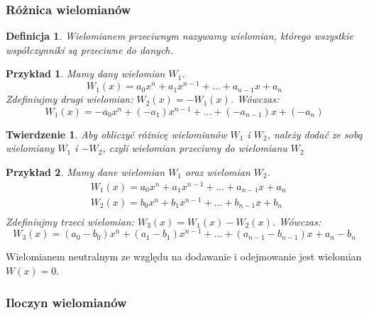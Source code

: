 \documentclass[twoside,a4paper]{book}
\newtheorem{theorem}{Twierdzenie}
\newtheorem{definition}{Definicja}
\newtheorem{example}{Przykład}
\begin{document}
\subsubsection{Różnica wielomianów}

\begin{definition}
	Wielomianem przeciwnym nazywamy wielomian, którego wszystkie współczynniki są przeciwne do danych.
\end{definition}

\begin{example}
	Mamy dany wielomian $W_1$.
	\begin{equation}
		W_1(x) = a_0x^n + a_1x^{n-1} + ... + a_{n-1}x + a_n
	\end{equation}
	Zdefiniujmy drugi wielomian: $W_2(x) = -W_1(x)$. Wówczas:
	\begin{equation}
		W_1(x) = -a_0x^n + (-a_1)x^{n-1} + ... + (-a_{n-1})x + (-a_n)
	\end{equation}
\end{example}

\begin{theorem}
	Aby obliczyć różnicę wielomianów $W_1$ i $W_2$, należy dodać ze sobą wielomiany $W_1$ i $-W_2$, czyli wielomian przeciwny do wielomianu $W_2$
\end{theorem}

\begin{example}
	Mamy dane wielomian $W_1$ oraz wielomian $W_2$.
	\begin{equation}
		\begin{split}
			&W_1(x) = a_0x^n + a_1x^{n-1} + ... + a_{n-1}x + a_n \\
			&W_2(x) = b_0x^n + b_1x^{n-1} + ... + b_{n-1}x + b_n \\
		\end{split}
	\end{equation}
	Zdefiniujmy trzeci wielomian: $W_3(x) = W_1(x) - W_2(x)$. Wówczas:
	\begin{equation}
		W_3(x) = (a_0-b_0)x^n + (a_1-b_1)x^{n-1} + ... + (a_{n-1} - b_{n-1})x + a_n - b_n
	\end{equation}
\end{example}

Wielomianem neutralnym ze względu na dodawanie i odejmowanie jest wielomian $W(x)=0$.

\subsubsection{Iloczyn wielomianów}
\end{document}
